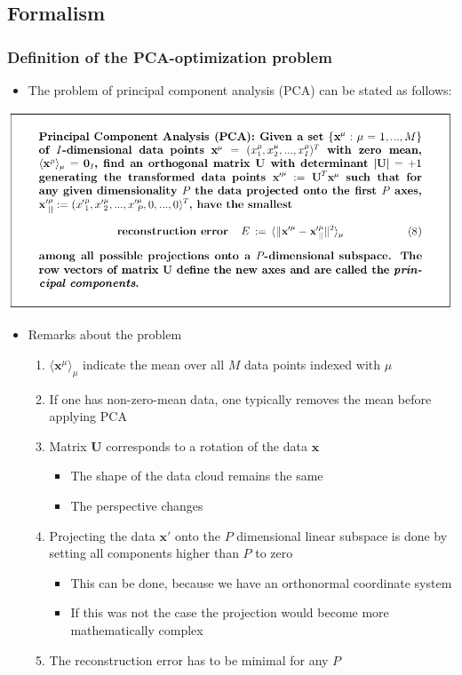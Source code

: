 \documentclass[11pt]{article}
\begin{document}
\subsection{Formalism}
\label{sec:org90e8467}
\subsubsection{Definition of the PCA-optimization problem}
\label{sec:org9edb3e0}
\begin{itemize}
\item The problem of principal component analysis (PCA) can be stated as follows:
\end{itemize}
\begin{center}
\includegraphics[width=.9\linewidth]{Principal Component Analysis/screenshot_2018-11-20_20-50-02.png}
\end{center}
\begin{itemize}
\item Remarks about the problem
\begin{enumerate}
\item \(\langle \pmb x^\mu \rangle_\mu\) indicate the mean over all \(M\) data points indexed with \(\mu\)
\item If one has non-zero-mean data, one typically removes the mean before applying PCA
\item Matrix \(\pmb U\) corresponds to a rotation of the data \(\pmb x\)
\begin{itemize}
\item The shape of the data cloud remains the same
\item The perspective changes
\end{itemize}
\item Projecting the data \(\pmb x'\) onto the \(P\) dimensional linear subspace is done by setting all components higher than \(P\) to zero
\begin{itemize}
\item This can be done, because we have an orthonormal coordinate system
\item If this was not the case the projection would become more mathematically complex
\end{itemize}
\item The reconstruction error has to be minimal for any \(P\)
\end{enumerate}
\end{itemize}
\end{document}
